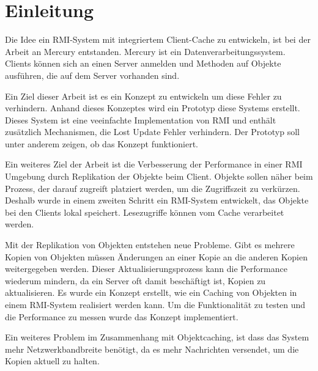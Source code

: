 \chapter{Einleitung}

Die Idee ein RMI-System mit integriertem Client-Cache zu entwickeln, ist bei der Arbeit an Mercury entstanden. Mercury ist ein Datenverarbeitungssystem. Clients können sich an einen Server anmelden und Methoden auf Objekte ausführen, die auf dem Server vorhanden sind. 

Ein Ziel dieser Arbeit ist es ein Konzept zu entwickeln um
diese Fehler zu verhindern. Anhand dieses Konzeptes wird ein Prototyp
diese Systems erstellt. Dieses System ist eine veeinfachte
Implementation von RMI und enthält zusätzlich Mechanismen, die Lost
Update Fehler verhindern. Der Prototyp soll unter anderem zeigen, ob
das Konzept funktioniert. 

Ein weiteres Ziel der Arbeit ist die Verbesserung der Performance in einer RMI Umgebung durch Replikation der Objekte beim Client. Objekte sollen näher beim Prozess, der darauf zugreift platziert werden, um die Zugriffszeit zu verkürzen. Deshalb wurde in einem zweiten Schritt ein RMI-System entwickelt, das Objekte bei den Clients lokal speichert. Lesezugriffe können vom Cache verarbeitet werden.

Mit der Replikation von Objekten entstehen neue Probleme. Gibt es mehrere Kopien von Objekten müssen Änderungen an einer Kopie an die anderen Kopien weitergegeben werden. Dieser Aktualisierungsprozess kann die Performance wiederum mindern, da ein Server oft damit beschäftigt ist, Kopien zu aktualisieren. Es wurde ein Konzept erstellt, wie ein Caching von Objekten in einem RMI-System realisiert werden kann. Um die Funktionalität zu testen und die Performance zu messen wurde das Konzept implementiert. 

Ein weiteres Problem im Zusammenhang mit Objektcaching, ist dass das System mehr Netzwerkbandbreite benötigt, da es mehr Nachrichten versendet, um die Kopien aktuell zu halten.



